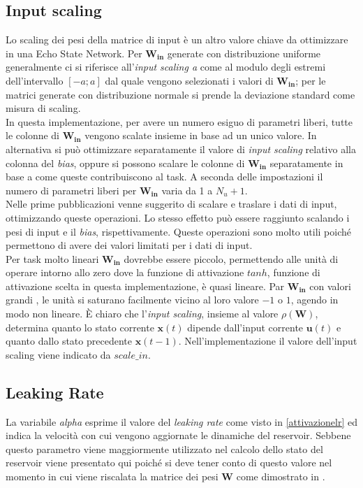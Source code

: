 \subsection{Input scaling}
Lo scaling dei pesi della matrice di input è un altro valore chiave da ottimizzare in una Echo State Network. Per $\mathbf{W_{in}}$ generate con distribuzione uniforme generalmente ci si riferisce all'\textit{input scaling a} come al modulo degli estremi dell'intervallo $[-a;a]$ dal quale vengono selezionati i valori di $\mathbf{W_{in}}$; per le matrici generate con distribuzione normale si prende la deviazione standard come misura di scaling.\\
In questa implementazione, per avere un numero esiguo di parametri liberi, tutte le colonne di $\mathbf{W_{in}}$ vengono scalate insieme in base ad un unico valore. In alternativa si può ottimizzare separatamente il valore di \textit{input scaling} relativo alla colonna del \textit{bias}, oppure si possono scalare le colonne di $\mathbf{W_{in}}$ separatamente in base a come queste contribuiscono al task. A seconda delle impostazioni il numero di parametri liberi per $\mathbf{W_{in}}$  varia da 1 a $N_u + 1$.\\
Nelle prime pubblicazioni venne suggerito di scalare e traslare i dati di input, ottimizzando queste operazioni. Lo stesso effetto può essere raggiunto scalando i pesi di input e il \textit{bias}, rispettivamente. Queste operazioni sono molto utili poiché permettono di avere dei valori limitati per i dati di input. \\
Per task molto lineari $\mathbf{W_{in}}$ dovrebbe essere piccolo, permettendo alle unità di operare intorno allo zero dove la funzione di attivazione $tanh$, funzione di attivazione scelta in questa implementazione, è quasi lineare. Par  $\mathbf{W_{in}}$ con valori grandi , le unità si saturano facilmente vicino al loro valore $-1$ o $1$, agendo in modo non lineare. È chiaro che l'\textit{input scaling}, insieme al valore $\rho(\mathbf{W})$, determina quanto lo stato corrente $\mathbf{x}(t)$ dipende dall'input corrente $\mathbf{u}(t)$ e quanto dallo stato precedente  $\mathbf{x}(t-1)$. Nell'implementazione il valore dell'input scaling viene indicato da $\mathit{scale\_in}$.

\subsection{Leaking Rate}
La variabile \textit{alpha} esprime il valore del \textit{leaking rate} come visto in \ref{attivazionelr} ed indica la velocità con cui vengono aggiornate le dinamiche del reservoir. Sebbene questo parametro viene maggiormente utilizzato nel calcolo dello stato del reservoir viene presentato qui  poiché si deve tener conto di questo valore nel momento in cui viene riscalata la matrice dei pesi $\mathbf{W}$ come dimostrato in \cite{leakingintegrator}. 




